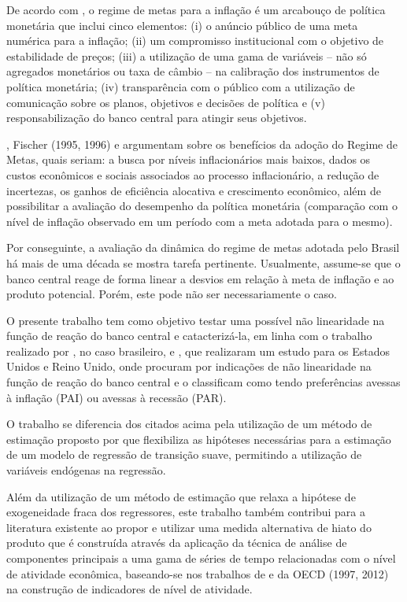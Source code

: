 \documentclass[
	article,			%
	11pt,				%
	oneside,			%
	a4paper,			%
	english,			%
	brazil,				%
	]{abntex2}
\begin{document}
	De acordo com , o regime de metas para a inflação é um arcabouço de política monetária que inclui cinco elementos: (i) o anúncio público de uma meta numérica para a inflação; (ii) um compromisso institucional com o objetivo de estabilidade de preços; (iii) a utilização de uma gama de variáveis – não só agregados monetários ou taxa de câmbio – na calibração dos instrumentos de política monetária; (iv) transparência com o público com a utilização de comunicação sobre os planos, objetivos e decisões de política e (v) responsabilização do banco central para atingir seus objetivos.
	
	, Fischer (1995, 1996) e  argumentam sobre os benefícios da adoção do Regime de Metas, quais seriam: a busca por níveis inflacionários mais baixos, dados os custos econômicos e sociais associados ao processo inflacionário, a redução de incertezas, os ganhos de eficiência alocativa e crescimento econômico, além de possibilitar a avaliação do desempenho da política monetária (comparação com o nível de inflação observado em um período com a meta adotada para o mesmo).
	
	Por conseguinte, a avaliação da dinâmica do regime de metas adotada pelo Brasil há mais de uma década se mostra tarefa pertinente. Usualmente, assume-se que o banco central reage de forma linear a desvios em relação à meta de inflação e ao produto potencial.  Porém, este pode não ser necessariamente o caso.
	
	O presente trabalho tem como objetivo testar uma possível não linearidade na função de reação do banco central e catacterizá-la, em linha com o trabalho realizado por , no caso brasileiro, e , que realizaram um estudo para os Estados Unidos e Reino Unido, onde procuram por indicações de não linearidade na função de reação do banco central e o classificam como tendo preferências avessas à inflação (PAI) ou avessas à recessão (PAR).
	
	O trabalho se diferencia dos citados acima pela utilização de um método de estimação proposto por  que flexibiliza as hipóteses necessárias para a estimação de um modelo de regressão de transição suave, permitindo a utilização de variáveis endógenas na regressão. 
	
	Além da utilização de um método de estimação que relaxa a hipótese de exogeneidade fraca dos regressores, este trabalho também contribui para a literatura existente ao propor e utilizar uma medida alternativa de hiato do produto que é construída através da aplicação da técnica de análise de componentes principais a uma gama de séries de tempo relacionadas com o nível de atividade econômica, baseando-se nos trabalhos de  e da OECD (1997, 2012) na construção de indicadores de nível de atividade.
	
\end{document}
